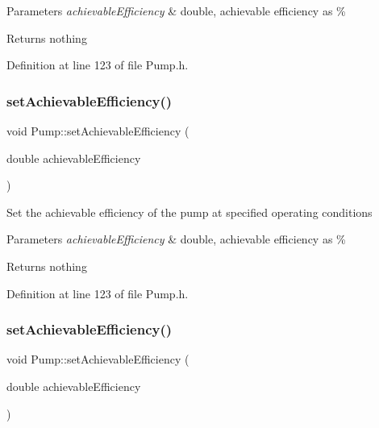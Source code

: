 \begin{DoxyParams}{Parameters}
{\em achievable\+Efficiency} & double, achievable efficiency as \%\\
\hline
\end{DoxyParams}
\begin{DoxyReturn}{Returns}
nothing 
\end{DoxyReturn}


Definition at line 123 of file Pump.\+h.

\mbox{\label{class_pump_a183f83fcc4b77e330451000df4d91046}} 
\subsubsection{\texorpdfstring{set\+Achievable\+Efficiency()}{setAchievableEfficiency()}\hspace{0.1cm}{\footnotesize\ttfamily [2/3]}}
{\footnotesize\ttfamily void Pump\+::set\+Achievable\+Efficiency (\begin{DoxyParamCaption}\item[{double}]{achievable\+Efficiency }\end{DoxyParamCaption})\hspace{0.3cm}{\ttfamily [inline]}}

Set the achievable efficiency of the pump at specified operating conditions


\begin{DoxyParams}{Parameters}
{\em achievable\+Efficiency} & double, achievable efficiency as \%\\
\hline
\end{DoxyParams}
\begin{DoxyReturn}{Returns}
nothing 
\end{DoxyReturn}


Definition at line 123 of file Pump.\+h.

\mbox{\label{class_pump_a183f83fcc4b77e330451000df4d91046}} 
\subsubsection{\texorpdfstring{set\+Achievable\+Efficiency()}{setAchievableEfficiency()}\hspace{0.1cm}{\footnotesize\ttfamily [3/3]}}
{\footnotesize\ttfamily void Pump\+::set\+Achievable\+Efficiency (\begin{DoxyParamCaption}\item[{double}]{achievable\+Efficiency }\end{DoxyParamCaption})\hspace{0.3cm}{\ttfamily [inline]}}

